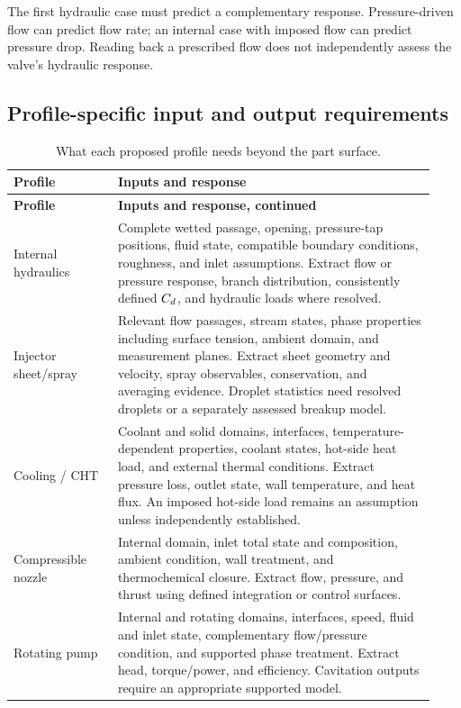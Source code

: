 The first hydraulic case must predict a complementary response. Pressure-driven flow can predict flow rate; an internal case with imposed flow can predict pressure drop. Reading back a prescribed flow does not independently assess the valve's hydraulic response.

\subsection{Profile-specific input and output requirements}

\begin{longtable}{@{}P{0.23\linewidth}P{0.70\linewidth}@{}}
\caption{What each proposed profile needs beyond the part surface.}\\
\toprule \textbf{Profile} & \textbf{Inputs and response}\\ \midrule
\endfirsthead
\toprule \textbf{Profile} & \textbf{Inputs and response, continued}\\ \midrule
\endhead
\bottomrule \endfoot
Internal hydraulics &
Complete wetted passage, opening, pressure-tap positions, fluid state, compatible boundary conditions, roughness, and inlet assumptions. Extract flow or pressure response, branch distribution, consistently defined $C_d$, and hydraulic loads where resolved.\\
Injector sheet/spray &
Relevant flow passages, stream states, phase properties including surface tension, ambient domain, and measurement planes. Extract sheet geometry and velocity, spray observables, conservation, and averaging evidence. Droplet statistics need resolved droplets or a separately assessed breakup model.\\
Cooling / CHT &
Coolant and solid domains, interfaces, temperature-dependent properties, coolant states, hot-side heat load, and external thermal conditions. Extract pressure loss, outlet state, wall temperature, and heat flux. An imposed hot-side load remains an assumption unless independently established.\\
Compressible nozzle &
Internal domain, inlet total state and composition, ambient condition, wall treatment, and thermochemical closure. Extract flow, pressure, and thrust using defined integration or control surfaces.\\
Rotating pump &
Internal and rotating domains, interfaces, speed, fluid and inlet state, complementary flow/pressure condition, and supported phase treatment. Extract head, torque/power, and efficiency. Cavitation outputs require an appropriate supported model.\\
\end{longtable}

